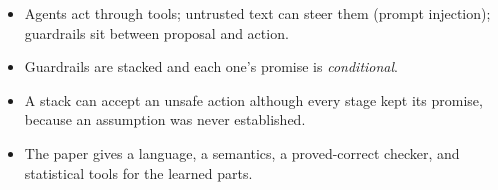 \begin{recap}
\begin{itemize}
\item Agents act through tools; untrusted text can steer them (prompt injection); guardrails sit between proposal and action.
\item Guardrails are stacked and each one's promise is \emph{conditional}.
\item A stack can accept an unsafe action although every stage kept its promise, because an assumption was never established.
\item The paper gives a language, a semantics, a proved-correct checker, and statistical tools for the learned parts.
\end{itemize}
\end{recap}
